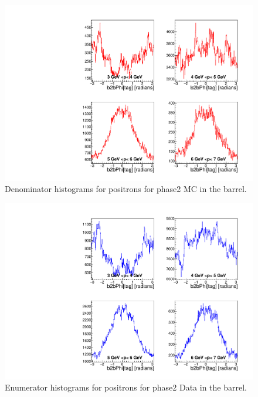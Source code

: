 \documentclass[a4paper,11pt,twosided,final,german,openbib,pdftex,listof=totoc,bibliography=totoc]{scrbook}
\begin{document}
\begin{appendix}
\begin{figure}[!htbp]
	\centering
	\includegraphics[width=\textwidth]{Plots/master/xPMPhiepBarrelD_MC}
	\caption[Momentum $\phi$ Positron Barrel Denominator Histogram Phase2 MC]{Denominator histograms for positrons for phase2 MC in the barrel.}
	\label{plt:PMPhiepBarrelD_MC}
\end{figure}


\begin{figure}[!htbp]
	\centering
	\includegraphics[width=\textwidth]{Plots/master/xPMPhiepBarrelE_Data}
	\caption[Momentum $\phi$ Positron Barrel Enumerator Histogram Phase2 Data]{Enumerator histograms for positrons for phase2 Data in the barrel.}
	\label{plt:PMPhiepBarrelE_Data}
\end{figure}








\end{appendix}
\end{document}
